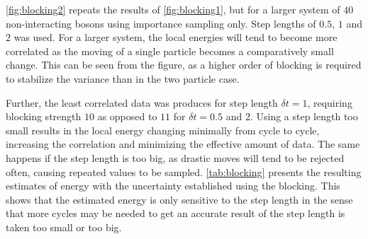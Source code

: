 \autoref{fig:blocking2} repeats the results of \autoref{fig:blocking1}, but for a larger system of $40$ non-interacting bosons using importance sampling only. Step lengths of $0.5$, $1$ and $2$ was used. For a larger system, the local energies will tend to become more correlated as the moving of a single particle becomes a comparatively small change. This can be seen from the figure, as a higher order of blocking is required to stabilize the variance than in the two particle case.

Further, the least correlated data was produces for step length $\delta t = 1$, requiring blocking strength $10$ as opposed to $11$ for $\delta t = 0.5$ and $2$. Using a step length too small results in the local energy changing minimally from cycle to cycle, increasing the correlation and minimizing the effective amount of data. The same happens if the step length is too big, as drastic moves will tend to be rejected often, causing repeated values to be sampled. \autoref{tab:blocking} presents the resulting estimates of energy with the uncertainty established using the blocking. This shows that the estimated energy is only sensitive to the step length in the sense that more cycles may be needed to get an accurate result of the step length is taken too small or too big.
 
